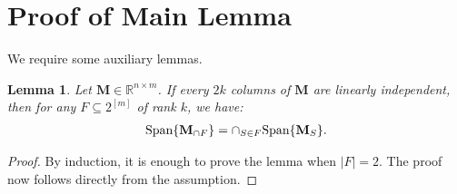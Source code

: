 \documentclass[9pt,twocolumn]{pnas-new}
\newtheorem{lemma}{Lemma}
\newtheorem{remark}{Remark}
\begin{document}
\showacknow %





\clearpage

\section{Proof of Main Lemma}

We require some auxiliary lemmas.

\begin{lemma}\label{SpanIntersectionLemma}
Let $\mathbf{M} \in \mathbb{R}^{n \times m}$. If every $2k$ columns of $\mathbf{M}$ are linearly independent, then for any $F \subseteq 2^{[m]}$ of rank $k$, we have:
\begin{align*}
\text{\rm Span}\{\mathbf{M}_{\cap F}\}  = \cap_{S \in F} \text{\rm Span}\{\mathbf{M}_S\}.
\end{align*}
\end{lemma}
\begin{proof}
By induction, it is enough to prove the lemma when $|F| = 2$. The proof now follows directly from the assumption.
\end{proof}
\end{document}
